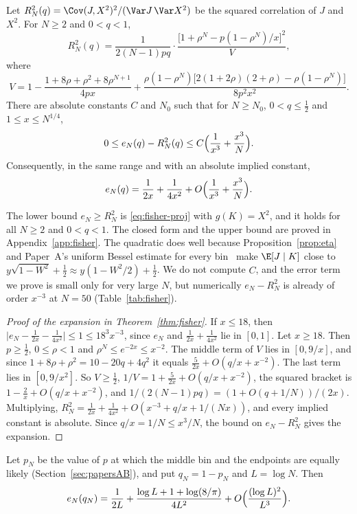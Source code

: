 \begin{theorem}\label{thm:fisher}
Let $R^2_N(q)=\Cov(J,X^2)^2/(\Var J\,\Var X^2)$ be the squared correlation
of $J$ and $X^2$. For $N\ge2$ and $0<q<1$,
\[
 R^2_N(q)=\frac1{2(N-1)pq}\cdot
 \frac{\bigl[1+\rho^N-p(1-\rho^N)/x\bigr]^2}{V},
\]
where
\[
 V=1-\frac{1+8\rho+\rho^2+8\rho^{N+1}}{4px}
 +\frac{\rho(1-\rho^N)\bigl[2(1+2\rho)(2+\rho)-\rho(1-\rho^N)\bigr]}{8p^2x^2}.
\]
There are absolute constants $C$ and $N_0$ such that for $N\ge N_0$,
$0<q\le\frac12$ and $1\le x\le N^{1/4}$,
\[
 0\le e_N(q)-R^2_N(q)\le C\Bigl(\frac1{x^3}+\frac{x^3}N\Bigr).
\]
Consequently, in the same range and with an absolute implied constant,
\[
 e_N(q)=\frac1{2x}+\frac1{4x^2}+O\Bigl(\frac1{x^3}+\frac{x^3}N\Bigr).
\]
\end{theorem}

The lower bound $e_N\ge R^2_N$ is \eqref{eq:fisher-proj} with $g(K)=X^2$,
and it holds for all $N\ge2$ and $0<q<1$. The closed form and the upper
bound are proved in Appendix~\ref{app:fisher}. The quadratic does well
because Proposition~\ref{prop:eta} and Paper~A's uniform Bessel estimate for
every bin~\cite[Thm.~6.2]{paperA} make $\E[J\mid K]$ close to
$y\sqrt{1-W^2}+\frac12\approx y(1-W^2/2)+\frac12$. We do not compute $C$,
and the error term we prove is small only for very large $N$, but
numerically $e_N-R^2_N$ is already of order $x^{-3}$ at $N=50$
(Table~\ref{tab:fisher}).

\begin{proof}[Proof of the expansion in Theorem~\ref{thm:fisher}]
If $x\le18$, then $\lvert e_N-\frac1{2x}-\frac1{4x^2}\rvert\le1\le18^3x^{-3}$,
since $e_N$ and $\frac1{2x}+\frac1{4x^2}$ lie in $[0,1]$. Let $x\ge18$. Then $p\ge\frac12$,
$0\le\rho<1$ and $\rho^N\le e^{-2x}\le x^{-2}$. The middle term of $V$ lies
in $[0,9/x]$, and since $1+8\rho+\rho^2=10-20q+4q^2$ it equals
$\frac5{2x}+O(q/x+x^{-2})$. The last term lies in $[0,9/x^2]$. So
$V\ge\frac12$, $1/V=1+\frac5{2x}+O(q/x+x^{-2})$, the squared bracket is
$1-\frac2x+O(q/x+x^{-2})$, and $1/(2(N-1)pq)=(1+O(q+1/N))/(2x)$. Multiplying,
$R^2_N=\frac1{2x}+\frac1{4x^2}+O(x^{-3}+q/x+1/(Nx))$, and every implied
constant is absolute. Since $q/x=1/N\le x^3/N$, the bound on $e_N-R^2_N$
gives the expansion.
\end{proof}

\begin{corollary}\label{cor:fisher-crossing}
Let $p_N$ be the value of $p$ at which the middle bin and the endpoints are
equally likely (Section~\ref{sec:papersAB}), and put $q_N=1-p_N$ and
$L=\log N$. Then
\[
 e_N(q_N)=\frac1{2L}+\frac{\log L+1+\log(8/\pi)}{4L^2}
 +O\Bigl(\frac{(\log L)^2}{L^3}\Bigr).
\]
\end{corollary}

